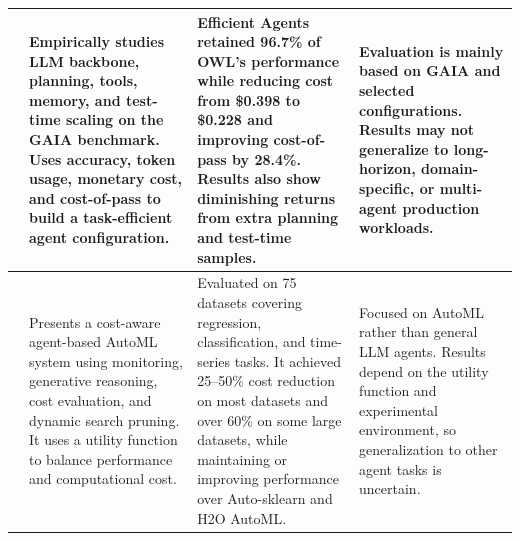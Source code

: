 \begin{table}[htbp]
{\begin{tabular}{c p{5.6cm} p{5.8cm} p{5.2cm}}
\cite{efficient_agents} &
Empirically studies LLM backbone, planning, tools, memory, and test-time scaling on the GAIA benchmark. Uses accuracy, token usage, monetary cost, and cost-of-pass to build a task-efficient agent configuration.
&
Efficient Agents retained 96.7\% of OWL's performance while reducing cost from \$0.398 to \$0.228 and improving cost-of-pass by 28.4\%. Results also show diminishing returns from extra planning and test-time samples.
&
Evaluation is mainly based on GAIA and selected configurations. Results may not generalize to long-horizon, domain-specific, or multi-agent production workloads.
\\
\hline

\cite{cost_aware_automl} &
Presents a cost-aware agent-based AutoML system using monitoring, generative reasoning, cost evaluation, and dynamic search pruning. It uses a utility function to balance performance and computational cost.
&
Evaluated on 75 datasets covering regression, classification, and time-series tasks. It achieved 25--50\% cost reduction on most datasets and over 60\% on some large datasets, while maintaining or improving performance over Auto-sklearn and H2O AutoML.
&
Focused on AutoML rather than general LLM agents. Results depend on the utility function and experimental environment, so generalization to other agent tasks is uncertain.
\\
\hline

\end{tabular}%
}
\end{table}